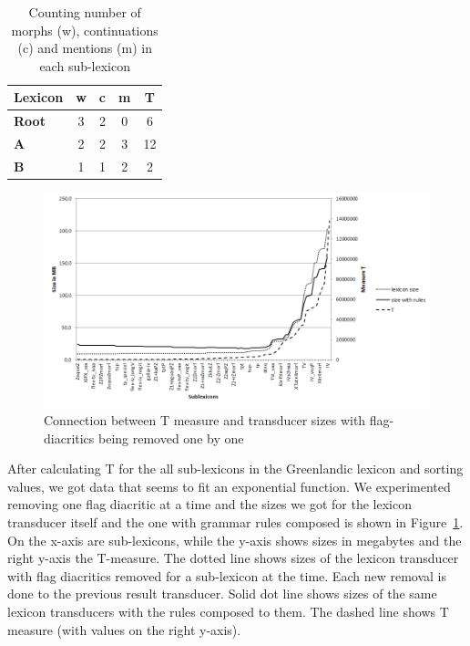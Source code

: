 \documentclass[10pt, a4paper]{article}
\begin{document}
\begin{table}
    \centering
    \begin{tabular}{|l|c|c|c|c|}
        \hline
        \bf Lexicon & \bf w & \bf c & \bf m & \bf T \\
        \hline\hline
        \bf Root & 3 & 2 & 0 & 6  \\
        \bf A & 2 & 2 & 3 & 12 \\
        \bf B  & 1 & 1 & 2 & 2 \\
        \hline
    \end{tabular}
    \caption{Counting number of morphs (w), continuations (c) and mentions (m) in each sub-lexicon
    \label{table:measureP}}
\end{table}



\begin{figure}
    \includegraphics[width=\textwidth]{t-measure.png}
     \caption{Connection between T measure and transducer sizes with flag-diacritics being removed one by one
     \label{fig:p-measure-sizes}}
\end{figure}

After calculating T for the all sub-lexicons in the Greenlandic lexicon and sorting values, we got data 
that seems to fit an exponential function. We experimented removing one flag diacritic at a 
time and the sizes we got for the lexicon transducer itself and the one with grammar rules composed is shown in 
Figure~\ref{fig:p-measure-sizes}. On the x-axis are sub-lexicons, while the y-axis shows sizes in megabytes and the right 
y-axis the T-measure. The dotted line shows sizes of the lexicon transducer with flag diacritics removed for 
a sub-lexicon at the time. Each new removal is done to the previous result transducer. 
Solid dot line shows sizes of the same lexicon transducers with the rules composed to them. 
The dashed line shows T measure (with values on the right y-axis).  
  
\end{document}
